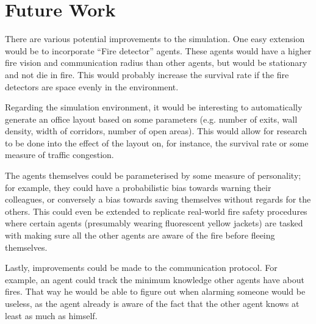 \documentclass[a4paper]{article}
\begin{document}
\section{Future Work}
\label{sec:future}
There are various potential improvements to the simulation. One easy extension would be to incorporate ``Fire detector'' agents. These agents would have a higher fire vision and communication radius than other agents, but would be stationary and not die in fire. This would probably increase the survival rate if the fire detectors are space evenly in the environment.

Regarding the simulation environment, it
would be interesting to automatically generate an office layout based on some
parameters (e.g. number of exits, wall density, width of corridors, number of
open areas). This would allow for research to be done into the effect of the
layout on, for instance, the survival rate or some measure of traffic congestion.

The agents themselves could be parameterised by some measure of personality; for
example, they could have a probabilistic bias towards warning their colleagues,
or conversely a bias towards saving themselves without regards for the others.
This could even be extended to replicate real-world fire safety procedures where
certain agents (presumably wearing fluorescent yellow jackets) are tasked with
making sure all the other agents are aware of the fire before fleeing themselves.

Lastly, improvements could be made to the communication protocol. For example, an agent could track the minimum knowledge other agents have about fires. That way he would be able to figure out when alarming someone would be useless, as the agent already is aware of the fact that the other agent knows at least as much as himself.
\end{document}
